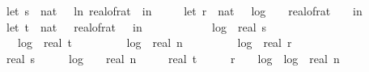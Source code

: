 \begin{isabellebody}
\ \ \ \ let\ s\ {\isacharequal}{\kern0pt}\ nat\ {\isasymlceil}{\isacharminus}{\kern0pt}{}{}\ {\isacharasterisk}{\kern0pt}\ ln\ {\isacharparenleft}{\kern0pt}real{\isacharunderscore}{\kern0pt}of{\isacharunderscore}{\kern0pt}rat\ {\isasymepsilon}{\isacharparenright}{\kern0pt}{\isasymrceil}\ in\ \isanewline
\ \ \ \ let\ r\ {\isacharequal}{\kern0pt}\ nat\ {\isacharparenleft}{\kern0pt}{}\ {\isacharasterisk}{\kern0pt}\ {\isasymlceil}log\ {}\ {\isacharparenleft}{\kern0pt}{}\ {\isacharslash}{\kern0pt}\ real{\isacharunderscore}{\kern0pt}of{\isacharunderscore}{\kern0pt}rat\ {\isasymdelta}{\isacharparenright}{\kern0pt}{\isasymrceil}\ {\isacharplus}{\kern0pt}\ {}{}{\isacharparenright}{\kern0pt}\ in\isanewline
\ \ \ \ let\ t\ {\isacharequal}{\kern0pt}\ nat\ {\isasymlceil}{}{}\ {\isacharslash}{\kern0pt}\ {\isacharparenleft}{\kern0pt}real{\isacharunderscore}{\kern0pt}of{\isacharunderscore}{\kern0pt}rat\ {\isasymdelta}{\isacharparenright}{\kern0pt}\ {\isasymrceil}\ in\isanewline
\ \ \ \ {}\ {\isacharplus}{\kern0pt}\isanewline
\ \ \ \ {}\ {\isacharasterisk}{\kern0pt}\ log\ {}\ {\isacharparenleft}{\kern0pt}real\ s\ {\isacharplus}{\kern0pt}\ {}{\isacharparenright}{\kern0pt}\ {\isacharplus}{\kern0pt}\isanewline
\ \ \ \ {}\ {\isacharasterisk}{\kern0pt}\ log\ {}\ {\isacharparenleft}{\kern0pt}real\ t\ {\isacharplus}{\kern0pt}\ {}{\isacharparenright}{\kern0pt}\ {\isacharplus}{\kern0pt}\isanewline
\ \ \ \ {}\ {\isacharasterisk}{\kern0pt}\ log\ {}\ {\isacharparenleft}{\kern0pt}real\ n\ {\isacharplus}{\kern0pt}\ {}{}{\isacharparenright}{\kern0pt}\ {\isacharplus}{\kern0pt}\isanewline
\ \ \ \ {}\ {\isacharasterisk}{\kern0pt}\ log\ {}\ {\isacharparenleft}{\kern0pt}real\ r\ {\isacharplus}{\kern0pt}\ {}{\isacharparenright}{\kern0pt}\ {\isacharplus}{\kern0pt}\isanewline
\ \ \ \ real\ s\ {\isacharasterisk}{\kern0pt}\ {\isacharparenleft}{\kern0pt}{}{}\ {\isacharplus}{\kern0pt}\ {}\ {\isacharasterisk}{\kern0pt}\ log\ {}\ {\isacharparenleft}{\kern0pt}{}{}\ {\isacharplus}{\kern0pt}\ real\ n{\isacharparenright}{\kern0pt}\ {\isacharplus}{\kern0pt}\isanewline
\ \ \ \ real\ t\ {\isacharasterisk}{\kern0pt}\ {\isacharparenleft}{\kern0pt}{}{}\ {\isacharplus}{\kern0pt}\ {}\ {\isacharasterisk}{\kern0pt}\ r\ {\isacharplus}{\kern0pt}\ {}\ {\isacharasterisk}{\kern0pt}\ log\ {}\ {\isacharparenleft}{\kern0pt}log\ {}\ {\isacharparenleft}{\kern0pt}real\ n\ {\isacharplus}{\kern0pt}\ {}{\isacharparenright}{\kern0pt}{\isacharparenright}{\kern0pt}{\isacharparenright}{\kern0pt}{\isacharparenright}{\kern0pt}{\isacharparenright}{\kern0pt}{\isachardoublequoteclose}\isanewline

\end{isabellebody}
